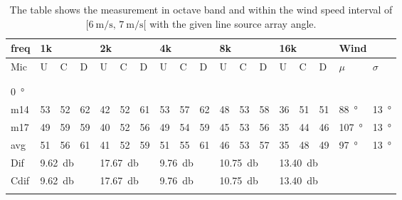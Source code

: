 \begin{table}[H]
\centering
\caption{The table shows the measurement in octave band and within the wind speed interval of $[\SI{6}{\meter\per\second},\, \SI{7}{\meter\per\second}[ $ with the given line source array angle.}
\setlength\tabcolsep{5pt} %
\begin{tabular}{l|l|l|l|l|l|l|l|l|l|l|l|l|l|l|l|l|l}
freq & \multicolumn{3}{l|}{1k} & \multicolumn{3}{l|}{2k} & \multicolumn{3}{l|}{4k} & \multicolumn{3}{l|}{8k} & \multicolumn{3}{l|}{16k}   &  \multicolumn{2}{l}{Wind}                      \\ \hline
Mic  & U      & C      & D     & U      & C      & D     & U      & C      & D     & U      & C      & D     & U  & C  & D & $\mu$ & $\sigma$ \\ \hline
 & \multicolumn{3}{l|}{} & \multicolumn{3}{l|}{} & \multicolumn{3}{l|}{} & \multicolumn{3}{l|}{} & \multicolumn{3}{l|}{} &      \multicolumn{2}{l}{}                        \\ 
 \multicolumn{18}{l}{ } \\   
\SI{0}{\degree}   & \multicolumn{3}{l|}{} & \multicolumn{3}{l|}{} & \multicolumn{3}{l|}{} & \multicolumn{3}{l|}{} &  \multicolumn{3}{l|}{} &   \multicolumn{2}{l}{}   \\  \hline
m14  & 53     & 52     & 62    & 42     & 52     & 61    & 53     & 57     & 62    & 48     & 53     & 58    & 36 & 51 & 51 & \SI{88}{\degree} & \SI{13}{\degree}   \\
m17  & 49     & 59     & 59    & 40     & 52     & 56    & 49     & 54     & 59    & 45     & 53     & 56    & 35 & 44 & 46 &\SI{107}{\degree} & \SI{13}{\degree}  \\ \hline
avg  &   51    &   56   & 61    &  41    &  52    &  59  &   51     &  55   &   61  &  46    & 53    &  57     & 35   & 48   & 49 & \SI{97}{\degree} & \SI{13}{\degree} \\ \hline  
Dif & \multicolumn{3}{l|}{\SI{9.62}{\decibel}} & \multicolumn{3}{l|}{\SI{17.67}{\decibel}} & \multicolumn{3}{l|}{\SI{9.76}{\decibel}} & \multicolumn{3}{l|}{\SI{10.75}{\decibel}} &  \multicolumn{3}{l|}{\SI{13.40}{\decibel}} &  \multicolumn{2}{l}{}  \\ \hline 
Cdif & \multicolumn{3}{l|}{\SI{9.62}{\decibel}} & \multicolumn{3}{l|}{\SI{17.67}{\decibel}} & \multicolumn{3}{l|}{\SI{9.76}{\decibel}} & \multicolumn{3}{l|}{\SI{10.75}{\decibel}} & \multicolumn{3}{l|}{\SI{13.40}{\decibel}}  &   \multicolumn{2}{l}{}   \\ 
 \multicolumn{18}{l}{ } \\                             

\end{tabular}
\end{table}
